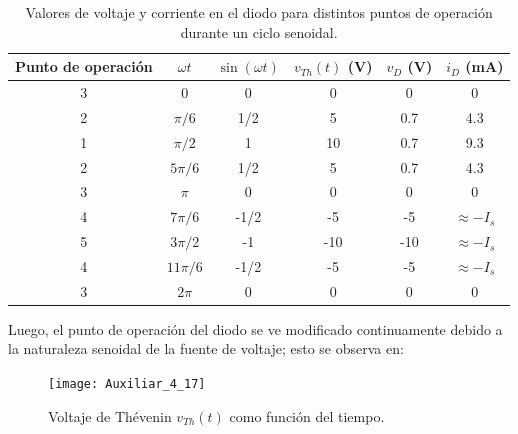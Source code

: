 \documentclass[
  11pt,
  letterpaper,
   addpoints,
   answers
  ]{exam}
\begin{document}
\begin{questions}
\begin{solution}
\begin{table}[H]
  \centering
  \begin{tabular}{c c c c c c}
    \hline
    Punto de operación & $\omega t$ & $\sin(\omega t)$ & $v_{Th}(t)$ (V) & $v_D$ (V) & $i_D$ (mA) \\
    \hline
    3 & 0 & 0 & 0 & 0 & 0 \\
    2 & $\pi/6$ & 1/2 & 5 & 0.7 & 4.3 \\
    1 & $\pi/2$ & 1 & 10 & 0.7 & 9.3 \\
    2 & $5\pi/6$ & 1/2 & 5 & 0.7 & 4.3 \\
    3 & $\pi$ & 0 & 0 & 0 & 0 \\
    4 & $7\pi/6$ & -1/2 & -5 & -5 & $\approx -I_s$ \\
    5 & $3\pi/2$ & -1 & -10 & -10 & $\approx -I_s$ \\
    4 & $11\pi/6$ & -1/2 & -5 & -5 & $\approx -I_s$ \\
    3 & $2\pi$ & 0 & 0 & 0 & 0 \\
    \hline
  \end{tabular}
  \caption{Valores de voltaje y corriente en el diodo para distintos puntos de operación durante un ciclo senoidal.}
  \label{tab:diodo-operacion}
\end{table}
Luego, el punto de operación del diodo se ve modificado continuamente debido a la naturaleza senoidal de la fuente de voltaje; esto se observa en:
\begin{figure}[H]
    \centering
\texttt{[image: Auxiliar\_4\_17]}
    \caption{Voltaje de Thévenin $v_{Th}(t)$ como función del tiempo.}
    \label{fig:voltaje-th}
\end{figure}


\end{solution}
\end{questions}
\end{document}
